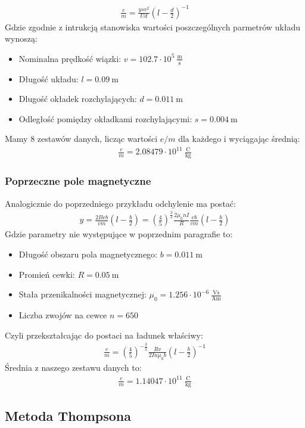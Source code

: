 \documentclass[paper=a4, fontsize=12pt]{scrartcl}
\begin{document}
\begin{align*}
\frac{e}{m}=\frac{ysv^2}{Ud}\left(l-\frac{d}{2}\right)^{-1}
\end{align*}
Gdzie zgodnie z intrukcją stanowiska wartości poszczególnych parmetrów układu wynoszą:
\begin{itemize}
	\item Nominalna prędkość wiązki: $v=102.7\cdot 10^5\:\mathrm{\frac{m}{s}}$
	\item Długość układu: $l=0.09\:\mathrm{m}$
	\item Dlugość okładek rozchylających: $d=0.011\:\mathrm{m}$
	\item Odległość pomiędzy okładkami rozchylającymi: $s=0.004\:\mathrm{m}$
\end{itemize}
Mamy $8$ zestawów danych, licząc wartości $e/m$ dla każdego i wyciągając średnią:
\begin{align}
\frac{e}{m}=2.08479\cdot10^{11}\:\mathrm{\frac{C}{kg}}
\end{align}
\subsubsection{Poprzeczne pole magnetyczne}
Analogicznie do poprzedniego przykładu odchylenie ma postać:
\begin{align*}
y=\frac{2Beb}{vm}\left(l-\frac{b}{2}\right)=\left(\frac{4}{5}\right)^\frac{3}{2}\frac{2\mu_0nI}{R}\frac{eb}{vm}\left(l-\frac{b}{2}\right)
\end{align*}
Gdzie parametry nie występujące w poprzednim paragrafie to:
\begin{itemize}
	\item Długość obszaru pola magnetycznego: $b=0.011\:\mathrm{m}$	
	\item Promień cewki: $R=0.05\:\mathrm{m}$
	\item Stała przenikalności magnetycznej: $\mu_0=1.256\cdot10^{-6}\:\frac{\mathrm{Vs}}{\mathrm{Am}}$
	\item Liczba zwojów na cewce $n=650$
\end{itemize}
Czyli przekształcając do postaci na ładunek właściwy:
 \begin{align*}
 \frac{e}{m}=\left(\frac{4}{5}\right)^{-\frac{3}{2}}\frac{Rv}{2In\mu_0b}\left(l-\frac{b}{2}\right)^{-1}
 \end{align*}
 Średnia z naszego zestawu danych to:
 \begin{align}
 \frac{e}{m}=1.14047\cdot10^{11}\:\mathrm{\frac{C}{kg}}
 \end{align}
\subsection{Metoda Thompsona}
\end{document}
